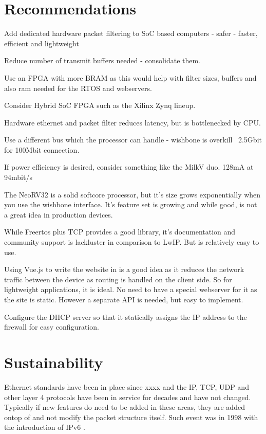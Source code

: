 \section{Recommendations}

Add dedicated hardware packet filtering to SoC based computers - safer - faster, efficient and lightweight

Reduce number of transmit buffers needed - consolidate them.

Use an FPGA with more BRAM as this would help with filter sizes, buffers and also ram needed for the RTOS and webservers.

Consider Hybrid SoC FPGA such as the Xilinx Zynq lineup.

Hardware ethernet and packet filter reduces latency, but is bottlenecked by CPU.

Use a different bus which the processor can handle - wishbone is overkill ~2.5Gbit for 100Mbit connection.

If power efficiency is desired, consider something like the MilkV duo. 128mA at 94mbit/s

The NeoRV32 is a solid softcore processor, but it's size grows exponentially when you use the wishbone interface. It's feature set is growing and while good, is not a great idea in production devices. 


While Freertos plus TCP provides a good library, it's documentation and community support is lackluster in comparison to LwIP. But is relatively easy to use. 
 
Using Vue.js to write the website in is a good idea as it reduces the network traffic between the device as routing is handled on the client side. So for lightweight applications, it is ideal. No need to have a special webserver for it as the site is static. However a separate API is needed, but easy to implement. 


Configure the DHCP server so that it statically assigns the IP address to the firewall for easy configuration. 


\section{Sustainability}

Ethernet standards have been in place since xxxx and the IP, TCP, UDP and other layer 4 protocols have been in service for decades and have not changed. Typically if new features do need to be added in these areas, they are added ontop of and not modify the packet structure itself. Such event was in 1998 with the introduction of IPv6 \cite{rfc2460}.


